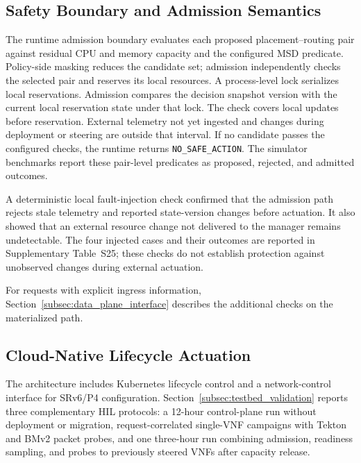 \documentclass[final,5p]{elsarticle}
\newcommand{\rev}[1]{\textcolor{revisiongreen}{#1}}
\let\newrev\rev
\begin{document}
\subsection{Safety Boundary and Admission Semantics}
\label{subsec:safety_boundary}
\label{subsec:freshness_revalidation}

\newrev{The runtime admission boundary evaluates each proposed placement--routing pair against residual CPU and memory capacity and the configured MSD predicate. Policy-side masking reduces the candidate set; admission independently checks the selected pair and reserves its local resources. A process-level lock serializes local reservations. Admission compares the decision snapshot version with the current local reservation state under that lock. The check covers local updates before reservation. External telemetry not yet ingested and changes during deployment or steering are outside that interval. If no candidate passes the configured checks, the runtime returns \texttt{NO\_SAFE\_ACTION}. The simulator benchmarks report these pair-level predicates as proposed, rejected, and admitted outcomes.}

\newrev{A deterministic local fault-injection check confirmed that the admission path rejects stale telemetry and reported state-version changes before actuation. It also showed that an external resource change not delivered to the manager remains undetectable. The four injected cases and their outcomes are reported in Supplementary Table~S25; these checks do not establish protection against unobserved changes during external actuation.}

\newrev{For requests with explicit ingress information, Section~\ref{subsec:data_plane_interface} describes the additional checks on the materialized path.}

\subsection{Cloud-Native Lifecycle Actuation}
\label{subsec:cloud_native_actuation}

\newrev{The architecture includes Kubernetes lifecycle control and a network-control interface for SRv6/P4 configuration. Section~\ref{subsec:testbed_validation} reports three complementary HIL protocols: a 12-hour control-plane run without deployment or migration, request-correlated single-VNF campaigns with Tekton and BMv2 packet probes, and one three-hour run combining admission, readiness sampling, and probes to previously steered VNFs after capacity release.}
\end{document}
